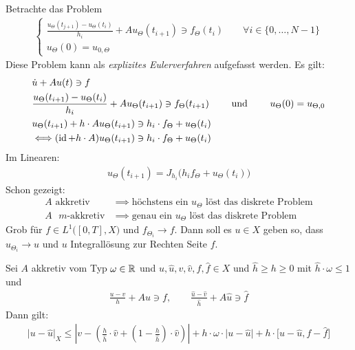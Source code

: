 Betrachte das Problem
\begin{align}\label{eqETheta}\tag{$E_\Theta$}
	\left\lbrace\begin{array}{l}
		\frac{u_\Theta(t_{j+1})-u_\Theta(t_i)}{h_i}+Au_\Theta(t_{i+1})\ni f_\Theta(t_i)\qquad\forall i\in\lbrace0,\ldots,N-1\rbrace\\
		u_\Theta(0)=u_{0,\Theta}
	\end{array}\right.
\end{align}
Diese Problem kann als \textit{explizites Eulerverfahren} aufgefasst werden. Es gilt:
\begin{align*}
	&\dot{u}+Au(t)\ni f\\
	&\frac{u_\Theta(t_{i+1})-u_\Theta(t_i)}{h_i}+Au_\Theta(t_{i+1})\ni f_\Theta(t_{i+1})
	\qquad\text{ und }\qquad
	u_\Theta(0)=u_{\Theta,0}\\
	&u_\Theta(t_{i+1})+h\cdot A u_\Theta(t_{i+1})\ni h_i\cdot f_\Theta+u_\Theta(t_i)\\
	&\Longleftrightarrow (\operatorname{id}+h\cdot A)u_\Theta(t_{i+1})\ni h_i\cdot f_\Theta+u_\Theta(t_i)
\end{align*}
Im Linearen:
\begin{align*}
	u_\Theta(t_{i+1})=J_{h_i}\big(h_i f_\Theta+u_\Theta(t_i)\big)
\end{align*}
Schon gezeigt:
\begin{align*}
	A\text{ akkretiv}&\implies\text{höchstens ein $u_\Theta$ löst das diskrete Problem}\\
	A\text{ $m$-akkretiv}&\implies\text{genau ein $u_\Theta$ löst das diskrete Problem}
\end{align*}
Grob für $f\in L^1\big([0,T],X\big)$ und $f_{\Theta_i}\longrightarrow f$. Dann soll es $u\in X$ geben so, dass $u_{\Theta_i}\longrightarrow u$ und $u$ Integrallösung zur Rechten Seite $f$.

\begin{lemma}
	Sei $A$ akkretiv vom Typ $\omega\in\mathbb{R}$ und $u,\hat{u},v,\hat{v},f,\hat{f}\in X$ und $\hat{h}\geq h\geq 0$ mit $\hat{h}\cdot\omega\leq 1$ und 
	\begin{align*}
		\frac{u-v}{h}+Au\ni f,\qquad\frac{\hat{u}-\hat{v}}{\hat{h}}+A\hat{u}\ni\hat{f}
	\end{align*}
	Dann gilt:
	\begin{align*}
		\big|u-\hat{u}\big|_X\leq\left|v-\left(\frac{h}{\hat{h}}\cdot\hat{v}+\left(1-\frac{h}{\hat{h}}\right)\cdot\hat{v}\right)\right|+h\cdot\omega\cdot\big|u-\hat{u}\big|+h\cdot\big[ u-\hat{u},f-\hat{f}\big]
	\end{align*}
\end{lemma}

